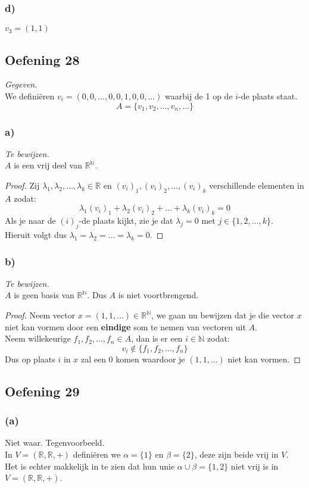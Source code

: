 \documentclass[lineaire_algebra_oplossingen.tex]{subfiles}
\begin{document}
\subsubsection*{d)}
$v_3 = (1,1)$

\subsection{Oefening 28}
\textit{Gegeven.}\\
We defini\"eren  $v_i = (0,0,\ldots,0,0,1,0,0,\ldots)$ waarbij de 1 op de $i$-de plaats staat.
\[
A = \{v_1,v_2,\ldots,v_n,\ldots\}
\]

\subsubsection*{a)}
\textit{Te bewijzen.}\\
$A$ is een vrij deel van $\mathbb{R}^\mathbb{N}$.
\begin{proof}
Zij $\lambda_1,\lambda_2,\ldots,\lambda_k \in \mathbb{R}$ en $(v_i)_1,(v_i)_2,\ldots,(v_i)_k$ verschillende elementen in $A$ zodat:
\[
\lambda_1 (v_i)_1 + \lambda_2 (v_i)_2 + \ldots + \lambda_k (v_i)_k = 0
\]
Als je naar de $(i)_j$-de plaats kijkt, zie je dat $\lambda_j=0$ met $j \in \{1,2,\ldots,k\}$.\\
Hieruit volgt dus $\lambda_1 = \lambda_2 = \ldots = \lambda_k = 0$.
\end{proof}

\subsubsection*{b)}
\textit{Te bewijzen.}\\
$A$ is geen basis van $\mathbb{R}^\mathbb{N}$. Dus $A$ is niet voortbrengend.
\begin{proof}
Neem vector $x=(1,1,\ldots) \in \mathbb{R}^\mathbb{N}$, we gaan nu bewijzen dat je die vector $x$ niet kan vormen door een \textbf{eindige} som te nemen van vectoren uit $A$.\\
Neem willekeurige $f_1,f_2,\ldots,f_n \in A$, dan is er een $i \in \mathbb{N}$ zodat:
\[
v_i \not \in \{f_1,f_2,\ldots,f_n\}
\]
Dus op plaats $i$ in $x$ zal een 0 komen waardoor je $(1,1,\ldots)$ niet kan vormen.
\end{proof}

\subsection{Oefening 29}
\subsubsection*{(a)}
Niet waar. Tegenvoorbeeld.\\
In $V=(\mathbb{R},\mathbb{R},+)$ defini\"eren we $\alpha = \{1\}$ en $\beta = \{2\}$, deze zijn beide vrij in $V$.\\
Het is echter makkelijk in te zien dat hun unie $\alpha \cup \beta = \{1,2\}$ niet vrij is in $V=(\mathbb{R},\mathbb{R},+)$.
\end{document}
